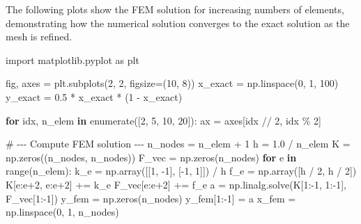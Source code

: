 \documentclass[
  11pt,
  a4paper,
]{scrbook}
\newenvironment{Shaded}{\begin{snugshade}}{\end{snugshade}}
\newcommand{\BuiltInTok}[1]{\textcolor[rgb]{0.00,0.23,0.31}{#1}}
\newcommand{\CommentTok}[1]{\textcolor[rgb]{0.37,0.37,0.37}{#1}}
\newcommand{\ControlFlowTok}[1]{\textcolor[rgb]{0.00,0.23,0.31}{\textbf{#1}}}
\newcommand{\DecValTok}[1]{\textcolor[rgb]{0.68,0.00,0.00}{#1}}
\newcommand{\FloatTok}[1]{\textcolor[rgb]{0.68,0.00,0.00}{#1}}
\newcommand{\ImportTok}[1]{\textcolor[rgb]{0.00,0.46,0.62}{#1}}
\newcommand{\KeywordTok}[1]{\textcolor[rgb]{0.00,0.23,0.31}{\textbf{#1}}}
\newcommand{\NormalTok}[1]{\textcolor[rgb]{0.00,0.23,0.31}{#1}}
\newcommand{\OperatorTok}[1]{\textcolor[rgb]{0.37,0.37,0.37}{#1}}
\begin{document}
The following plots show the FEM solution for increasing numbers of
elements, demonstrating how the numerical solution converges to the
exact solution as the mesh is refined.

\begin{Shaded}
\begin{Highlighting}[]
\ImportTok{import}\NormalTok{ matplotlib.pyplot }\ImportTok{as}\NormalTok{ plt}

\NormalTok{fig, axes }\OperatorTok{=}\NormalTok{ plt.subplots(}\DecValTok{2}\NormalTok{, }\DecValTok{2}\NormalTok{, figsize}\OperatorTok{=}\NormalTok{(}\DecValTok{10}\NormalTok{, }\DecValTok{8}\NormalTok{))}
\NormalTok{x\_exact }\OperatorTok{=}\NormalTok{ np.linspace(}\DecValTok{0}\NormalTok{, }\DecValTok{1}\NormalTok{, }\DecValTok{100}\NormalTok{)}
\NormalTok{y\_exact }\OperatorTok{=} \FloatTok{0.5} \OperatorTok{*}\NormalTok{ x\_exact }\OperatorTok{*}\NormalTok{ (}\DecValTok{1} \OperatorTok{{-}}\NormalTok{ x\_exact)}

\ControlFlowTok{for}\NormalTok{ idx, n\_elem }\KeywordTok{in} \BuiltInTok{enumerate}\NormalTok{([}\DecValTok{2}\NormalTok{, }\DecValTok{5}\NormalTok{, }\DecValTok{10}\NormalTok{, }\DecValTok{20}\NormalTok{]):}
\NormalTok{    ax }\OperatorTok{=}\NormalTok{ axes[idx }\OperatorTok{//} \DecValTok{2}\NormalTok{, idx }\OperatorTok{\%} \DecValTok{2}\NormalTok{]}

    \CommentTok{\# {-}{-}{-} Compute FEM solution {-}{-}{-}}
\NormalTok{    n\_nodes }\OperatorTok{=}\NormalTok{ n\_elem }\OperatorTok{+} \DecValTok{1}
\NormalTok{    h }\OperatorTok{=} \FloatTok{1.0} \OperatorTok{/}\NormalTok{ n\_elem}
\NormalTok{    K }\OperatorTok{=}\NormalTok{ np.zeros((n\_nodes, n\_nodes))}
\NormalTok{    F\_vec }\OperatorTok{=}\NormalTok{ np.zeros(n\_nodes)}
    \ControlFlowTok{for}\NormalTok{ e }\KeywordTok{in} \BuiltInTok{range}\NormalTok{(n\_elem):}
\NormalTok{        k\_e }\OperatorTok{=}\NormalTok{ np.array([[}\DecValTok{1}\NormalTok{, }\OperatorTok{{-}}\DecValTok{1}\NormalTok{], [}\OperatorTok{{-}}\DecValTok{1}\NormalTok{, }\DecValTok{1}\NormalTok{]]) }\OperatorTok{/}\NormalTok{ h}
\NormalTok{        f\_e }\OperatorTok{=}\NormalTok{ np.array([h }\OperatorTok{/} \DecValTok{2}\NormalTok{, h }\OperatorTok{/} \DecValTok{2}\NormalTok{])}
\NormalTok{        K[e:e}\OperatorTok{+}\DecValTok{2}\NormalTok{, e:e}\OperatorTok{+}\DecValTok{2}\NormalTok{] }\OperatorTok{+=}\NormalTok{ k\_e}
\NormalTok{        F\_vec[e:e}\OperatorTok{+}\DecValTok{2}\NormalTok{] }\OperatorTok{+=}\NormalTok{ f\_e}
\NormalTok{    a }\OperatorTok{=}\NormalTok{ np.linalg.solve(K[}\DecValTok{1}\NormalTok{:}\OperatorTok{{-}}\DecValTok{1}\NormalTok{, }\DecValTok{1}\NormalTok{:}\OperatorTok{{-}}\DecValTok{1}\NormalTok{], F\_vec[}\DecValTok{1}\NormalTok{:}\OperatorTok{{-}}\DecValTok{1}\NormalTok{])}
\NormalTok{    y\_fem }\OperatorTok{=}\NormalTok{ np.zeros(n\_nodes)}
\NormalTok{    y\_fem[}\DecValTok{1}\NormalTok{:}\OperatorTok{{-}}\DecValTok{1}\NormalTok{] }\OperatorTok{=}\NormalTok{ a}
\NormalTok{    x\_fem }\OperatorTok{=}\NormalTok{ np.linspace(}\DecValTok{0}\NormalTok{, }\DecValTok{1}\NormalTok{, n\_nodes)}


\end{Highlighting}
\end{Shaded}
\end{document}
